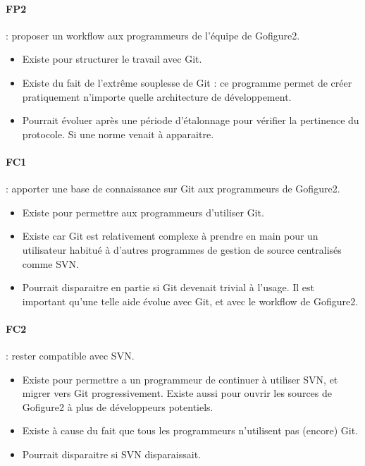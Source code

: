 \paragraph*{FP2} : proposer un workflow aux programmeurs de l'équipe de Gofigure2.
\begin{itemize}
  \item Existe pour structurer le travail avec Git.
  \item Existe du fait de l'extrême souplesse de Git : ce programme 
  permet de créer pratiquement n'importe quelle architecture de développement.
  \item Pourrait évoluer après une période d'étalonnage pour vérifier la pertinence du protocole.
  Si une norme venait à apparaitre.
\end{itemize}

\paragraph*{FC1} : apporter une base de connaissance sur Git aux programmeurs de Gofigure2.
\begin{itemize}
  \item Existe pour permettre aux programmeurs d'utiliser Git.
  \item Existe car Git est relativement complexe à prendre en main 
  pour un utilisateur habitué à d'autres programmes de gestion de source centralisés comme SVN.
  \item Pourrait disparaitre en partie si Git devenait trivial à l'usage.
  Il est important qu'une telle aide évolue avec Git, et avec le workflow de Gofigure2.
\end{itemize}

\paragraph*{FC2} : rester compatible avec SVN.
\begin{itemize}
  \item Existe pour permettre a un programmeur de continuer à utiliser SVN, et migrer vers Git progressivement.
  Existe aussi pour ouvrir les sources de Gofigure2 à plus de développeurs potentiels.
  \item Existe à cause du fait que tous les programmeurs n'utilisent pas (encore) Git.
  \item Pourrait disparaitre si SVN disparaissait.
\end{itemize}

